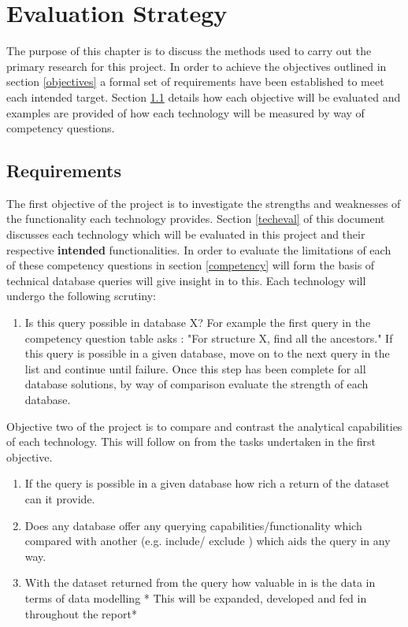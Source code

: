 \chapter{Evaluation Strategy}
The purpose of this chapter is to discuss the methods used to carry out the primary research for this project. In order to achieve the objectives outlined in section \ref{objectives} a formal set of requirements have been established to meet each intended target. Section \ref{requirements} details how each objective will be evaluated and examples are provided of how each technology will be measured by way of competency questions.

\section{Requirements}\label{requirements}

The first objective of the project is to investigate the strengths and weaknesses of the functionality each technology provides. Section \ref{techeval} of this document discusses each technology which will be evaluated in this project and their respective \textbf{intended} functionalities. In order to evaluate the limitations of each of these competency questions in section \ref{competency} will form the basis of technical database queries will give insight in to this. Each technology will undergo the following scrutiny:

\begin{enumerate}
\item Is this query possible in database X?
For example the first query in the competency question table asks : "For structure X, find all the ancestors." If this query is possible in a given database, move on to the next query in the list and continue until failure. Once this step has been complete for all database solutions, by way of comparison evaluate the strength of each database.
\end{enumerate}

\parindent 0pt Objective two of the project is to compare and contrast the analytical capabilities of each technology. This will follow on from the tasks undertaken in the first objective.

\begin{enumerate}
\item If the query is possible in a given database how rich a return of the dataset can it provide.
\item Does any database offer any querying capabilities/functionality which compared with another (e.g. include/ exclude ) which aids the query in any way.
\item With the dataset returned from the query how valuable in is the data in terms of data modelling * This will be expanded, developed and fed in throughout the report* 
\end{enumerate}

